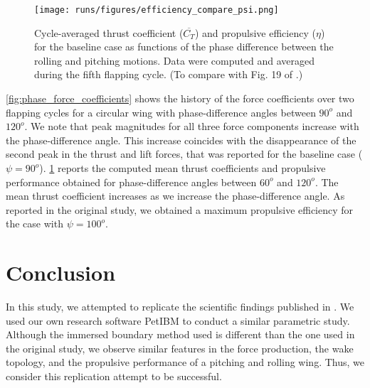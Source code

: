 \begin{figure}
  \centering
  \texttt{[image: runs/figures/efficiency\_compare\_psi.png]}
  \caption{Cycle-averaged thrust coefficient ($\overline{C_T}$) and propulsive efficiency ($\eta$) for the baseline case as functions of the phase difference between the rolling and pitching motions. Data were computed and averaged during the fifth flapping cycle. (To compare with Fig. 19 of \citet{li_dong_2016}.)}
  \label{fig:phase_efficiency}
\end{figure}

\cref{fig:phase_force_coefficients} shows the history of the force coefficients over two flapping cycles for a circular wing with phase-difference angles between $90^o$ and $120^o$.
We note that peak magnitudes for all three force components increase with the phase-difference angle.
This increase coincides with the disappearance of the second peak in the thrust and lift forces, that was reported for the baseline case ($\psi = 90^o$).
\cref{fig:phase_efficiency} reports the computed mean thrust coefficients and propulsive performance obtained for phase-difference angles between $60^o$ and $120^o$.
The mean thrust coefficient increases as we increase the phase-difference angle.
As reported in the original study, we obtained a maximum propulsive efficiency for the case with $\psi = 100^o$.

\section{Conclusion}

In this study, we attempted to replicate the scientific findings published in \citet{li_dong_2016}.
We used our own research software PetIBM\cite{chuang_et_al_2018} to conduct a similar parametric study.
Although the immersed boundary method used is different than the one used in the original study, we observe similar features in the force production, the wake topology, and the propulsive performance of a pitching and rolling wing.
Thus, we consider this replication attempt to be successful.

